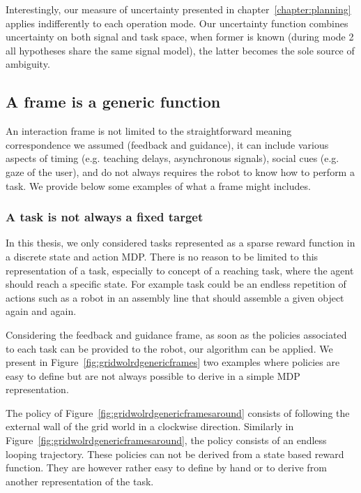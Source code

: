 Interestingly, our measure of uncertainty presented in chapter~\ref{chapter:planning} applies indifferently to each operation mode. Our uncertainty function combines uncertainty on both signal and task space, when former is known (during mode 2 all hypotheses share the same signal model), the latter becomes the sole source of ambiguity.

\subsection{A frame is a generic function}
\label{chapter:limitations:framegeneric}

An interaction frame is not limited to the straightforward meaning correspondence we assumed (feedback and guidance), it can include various aspects of timing (e.g. teaching delays, asynchronous signals), social cues (e.g. gaze of the user), and do not always requires the robot to know how to perform a task. We provide below some examples of what a frame might includes.

\subsubsection*{A task is not always a fixed target}

In this thesis, we only considered tasks represented as a sparse reward function in a discrete state and action MDP. There is no reason to be limited to this representation of a task, especially to concept of a reaching task, where the agent should reach a specific state. For example task could be an endless repetition of actions such as a robot in an assembly line that should assemble a given object again and again.

Considering the feedback and guidance frame, as soon as the policies associated to each task can be provided to the robot, our algorithm can be applied. We present in Figure~\ref{fig:gridwolrdgenericframes} two examples where policies are easy to define but are not always possible to derive in a simple MDP representation.

The policy of Figure~\ref{fig:gridwolrdgenericframesaround} consists of following the external wall of the grid world in a clockwise direction. Similarly in Figure~\ref{fig:gridwolrdgenericframesaround}, the policy consists of an endless looping trajectory. These policies can not be derived from a state based reward function. They are however rather easy to define by hand or to derive from another representation of the task.

